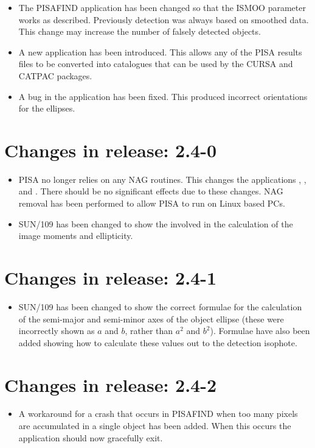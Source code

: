 \begin{itemize}
  \item The PISAFIND application has been changed so that the ISMOO
        parameter works as described. Previously detection was always
        based on smoothed data. This change may increase the number of
        falsely detected objects.
  \item A new application  has been introduced. This
        allows any of the PISA results files to be converted into
        catalogues that can be used by the CURSA and CATPAC packages.
  \item A bug in the  application has been fixed. This
        produced incorrect orientations for the ellipses.
\end{itemize}

\section{Changes in release: 2.4-0}

\begin{itemize}
   \item PISA no longer relies on any NAG routines. This changes the 
    applications , ,  and 
    . There should be no significant effects due to
    these changes. NAG removal has been performed to allow PISA to run
    on Linux based PCs.

    \item SUN/109 has been changed to show the
      involved in the calculation of the 
     image moments and ellipticity.
\end{itemize}

\section{Changes in release: 2.4-1}

\begin{itemize}
    \item SUN/109 has been changed to show the correct formulae
    for the calculation of the semi-major and semi-minor axes of the
    object ellipse (these were incorrectly shown as $a$ and $b$,
    rather than $a^{2}$ and $b^{2}$). Formulae have also been added 
    showing how to calculate these values out to the detection isophote.
\end{itemize}

\section{Changes in release: 2.4-2}

\begin{itemize}
    \item 
      A workaround for a crash that occurs in PISAFIND when too many
      pixels are accumulated in a single object has been added. When this
      occurs the application should now gracefully exit.
\end{itemize}


